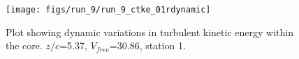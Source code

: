 \begin{figure}[H]
\centering
\texttt{[image: figs/run\_9/run\_9\_ctke\_01rdynamic]}
\caption{Plot showing dynamic variations in turbulent kinetic energy within the core. $z/c$=5.37, $V_{free}$=30.86, station 1.}
\label{fig:run_9_ctke_01rdynamic}
\end{figure}



